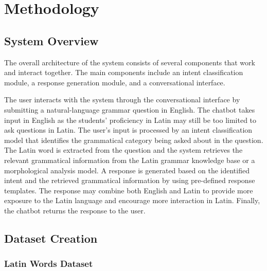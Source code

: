 \graphicspath{{content/chapters/4_methodology/figures/}}

\chapter{Methodology}%
\label{chp:methodology}

\section{System Overview}%
\label{sec:system_overview}

The overall architecture of the system consists of several components that work and interact together.
The main components include an intent classification module, a response generation module, and a conversational interface.


The user interacts with the system through the conversational interface by submitting a natural-language grammar question in English. 
The chatbot takes input in English as the students' proficiency in Latin may still be too limited to ask questions in Latin.
The user's input is processed by an intent classification model that identifies the grammatical category being asked about in the question.
The Latin word is extracted from the question and the system retrieves the relevant grammatical information from the Latin grammar knowledge base or a morphological analysis model.
A response is generated based on the identified intent and the retrieved grammatical information by using pre-defined response templates.
The response may combine both English and Latin to provide more exposure to the Latin language and encourage more interaction in Latin.
Finally, the chatbot returns the response to the user.


\section{Dataset Creation}%
\label{sec:dataset_creation}

\subsection{Latin Words Dataset}
\label{sec:latin_words_dataset}



